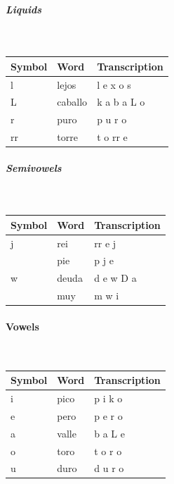 \documentclass[twoside,a4paper]{book}
\begin{document}
\subparagraph{Liquids}\strut\\
\begin{tabular}{lll}
	Symbol & Word & Transcription\\
	\hline
	l & lejos & l e x o s\\
	L & caballo & k a b a L o\\
	r & puro & p u r o\\
	rr & torre & t o rr e
\end{tabular}

\subparagraph{Semivowels}\strut\\
\begin{tabular}{lll}
	Symbol & Word & Transcription\\
	\hline
	j & rei & rr e j\\
	 & pie & p j e\\
	w & deuda & d e w D a\\
	 & muy & m w i
\end{tabular}

\paragraph{Vowels}\strut\\
\begin{tabular}{lll}
	Symbol & Word & Transcription\\
	\hline
	i & pico & p i k o\\
	e & pero & p e r o\\
	a & valle & b a L e\\
	o & toro & t o r o\\
	u & duro & d u r o
\end{tabular}

\newpage
\end{document}
